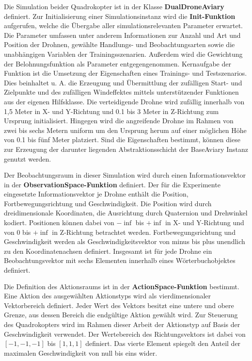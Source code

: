Die Simulation beider Quadrokopter ist in der Klasse \textbf{DualDroneAviary} definiert.
Zur Initialisierung einer Simulationsinstanz wird die \textbf{Init-Funktion} aufgerufen, welche die Übergabe aller simulationsrelevanten Parameter erwartet.
Die Parameter umfassen unter anderem Informationen zur Anzahl und Art und Position der Drohnen, gewählte Handlungs- und Beobachtungsarten sowie die unabhängigen Variablen der Trainingsszenarien.
Außerdem wird die Gewichtung der Belohnungsfunktion als Parameter entgegengenommen.
Kernaufgabe der Funktion ist die Umsetzung der Eigenschaften eines Trainings- und Testszenarios.
Dies beinhaltet u. A. die Erzeugung und Übermittlung der zufälligen Start- und Zielpunkte und des zufälligen Windeffektes mittels unterstützender Funktionen aus der eigenen Hilfsklasse.
Die verteidigende Drohne wird zufällig innerhalb von 1,5 Meter in X- und Y-Richtung und 0.1 bis 3 Meter in Z-Richtung zum Ursprung initialisiert.
Hingegen wird die angreifende Drohne im Rahmen von zwei bis sechs Metern uniform um den Ursprung herum auf einer möglichen Höhe von 0.1 bis fünf Meter platziert.
Sind die Eigenschaften bestimmt, können diese zur Erzeugung der darunter liegenden Abstraktionsschicht der BaseAviary Instanz genutzt werden.

Der Beobachtungsraum in dieser Simulation wird durch einen Informationsvektor in der \textbf{ObservationSpace-Funktion} definiert.
Der für die Experimente eingesetzte Informationsvektor je Drohne enthält die Position, Fortbewegungsrichtung und Geschwindigkeit.
Die Position wird durch dreidimensionale Koordinaten, die Ausrichtung durch Quaternion und Drehwinkel kodiert.
Positionen können dabei von $- \inf$ bis $+ \inf$ in X- und Y-Richtung und von $0$ bis $+ \inf$ in Z-Richtung betrachtet werden.
Fortbewegungsrichtung und Geschwindigkeit werden als Geschwindigkeitsvektor von minus bis plus unendlich zu den Koordinatenachsen definiert.
Insgesamt ist für jede Drohne ein Beobachtungsvektor mit sechs Elementen innerhalb eines Wörterbuchobjektes definiert.

Die Definition des Aktionsraums ist in der \textbf{ActionSpace-Funktion} bestimmt.
Eine Aktion des ausgewählten Aktionstyps wird als vierdimensionaler Vektorbereich definiert.
Jeder Wert des Vektors besitzt eine untere und obere Grenze, aus dessen Bereich die endgültige Aktion gewählt wird.
Zur Steuerung des Quadrokopters wird im Rahmen dieser Arbeit der Aktionstyp auf Basis der Geschwindigkeit verwendet.
Der Wertebereich des Richtungsvektors ist dabei von $[-1,-1,-1]$ bis $[1,1,1]$ definiert. 
Das vierte Element spiegelt den Anteil der maximalen Geschwindigkeit von null bis eins wider.

